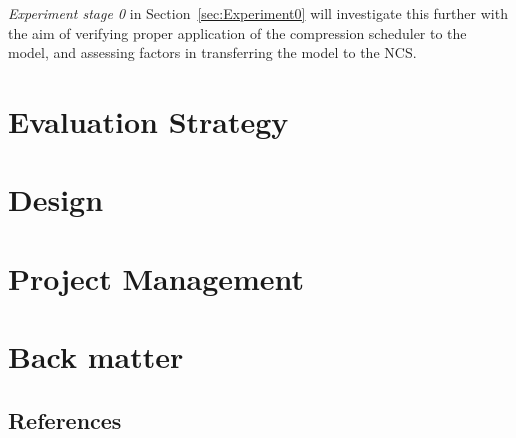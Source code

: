 \documentclass[11pt]{article}
\begin{document}
\emph{Experiment stage 0} in Section~\ref{sec:Experiment0} will investigate this further with the aim of verifying proper application of the compression scheduler to the model, and assessing factors in transferring the model to the NCS.

\newpage
\section{Evaluation Strategy}


\newpage
\section{Design}\label{sec:Design}


\newpage
\section{Project Management}


\newpage
\appendix
\section{Back matter}
\subsection{References}
\printbibliography
\end{document}
